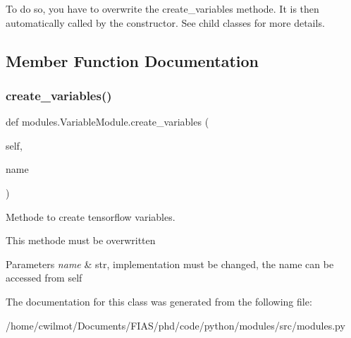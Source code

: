 To do so, you have to overwrite the \textquotesingle{}create\+\_\+variables\textquotesingle{} methode. It is then automatically called by the constructor. See child classes for more details. 

\subsection{Member Function Documentation}
\mbox{\label{classmodules_1_1_variable_module_a7a01e27208c41122163147ff0cf73fe8}} 
\subsubsection{\texorpdfstring{create\+\_\+variables()}{create\_variables()}}
{\footnotesize\ttfamily def modules.\+Variable\+Module.\+create\+\_\+variables (\begin{DoxyParamCaption}\item[{}]{self,  }\item[{}]{name }\end{DoxyParamCaption})}



Methode to create tensorflow variables. 

This methode must be overwritten 
\begin{DoxyParams}{Parameters}
{\em name} & str, implementation must be changed, the name can be accessed from self \\
\hline
\end{DoxyParams}


The documentation for this class was generated from the following file\+:\begin{DoxyCompactItemize}
\item 
/home/cwilmot/\+Documents/\+F\+I\+A\+S/phd/code/python/modules/src/modules.\+py\end{DoxyCompactItemize}
